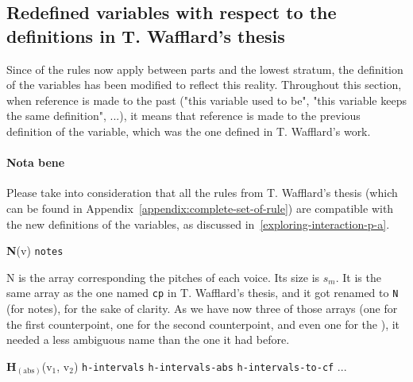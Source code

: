 \subsection{Redefined variables with respect to the definitions in T. Wafflard's thesis} \label{subsection:modified_variables}
Since of the rules now apply between parts and the lowest stratum, the definition of the variables has been modified to reflect this reality. Throughout this section, when reference is made to the past ("this variable used to be", "this variable keeps the same definition", ...), it means that reference is made to the previous definition of the variable, which was the one defined in T. Wafflard's work.

\paragraph{Nota bene}
Please take into consideration that all the rules from T. Wafflard's thesis (which can be found in Appendix~\ref{appendix:complete-set-of-rule}) are compatible with the new definitions of the variables, as discussed in~\ref{exploring-interaction-p-a}. 

\vspace{.5cm} \noindent \textbf{N}(v) \hspace{.2cm} \texttt{notes} 

N is the array corresponding the pitches of each voice. Its size is $s_m$. It is the same array as the one named \texttt{cp} in T. Wafflard's thesis, and it got renamed to \texttt{N} (for notes), for the sake of clarity. As we have now three of those arrays (one for the first counterpoint, one for the second counterpoint, and even one for the \cf), it needed a less ambiguous name than the one it had before.



\vspace{.5cm} \noindent \textbf{H}$_{(\text{abs})}$(v$_1$, v$_2$) \hspace{.2cm} \texttt{h-intervals}\hspace{.2cm} \texttt{h-intervals-abs}\hspace{.2cm} \texttt{h-intervals-to-cf}\hspace{.2cm}  ...

